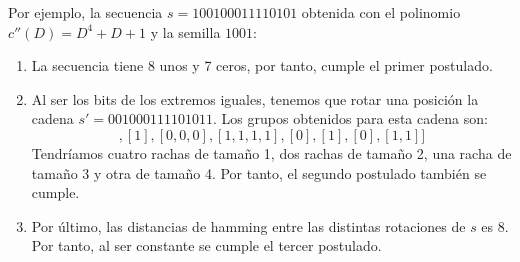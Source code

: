 \documentclass[10pt,spanish]{article}
\begin{document}
Por ejemplo, la secuencia $s=100100011110101$ obtenida con el polinomio $c''(D) = D^4 + D + 1$ y la semilla $1001$:
\begin{enumerate}[---]
    \item La secuencia tiene 8 unos y 7 ceros, por tanto, cumple el primer postulado.
    \item Al ser los bits de los extremos iguales, tenemos que rotar una posición la cadena $s' = 001000111101011$. Los grupos obtenidos para esta cadena son:
    \begin{displaymath}
        [[0,0],[1],[0,0,0],[1,1,1,1],[0],[1],[0],[1,1]]
    \end{displaymath}
    Tendríamos cuatro rachas de tamaño 1, dos rachas de tamaño 2, una racha de tamaño 3 y otra de tamaño 4. Por tanto, el segundo postulado también se cumple.
    \item Por último, las distancias de hamming entre las distintas rotaciones de $s$ es 8. Por tanto, al ser constante se cumple el tercer postulado.
\end{enumerate}
\end{document}
